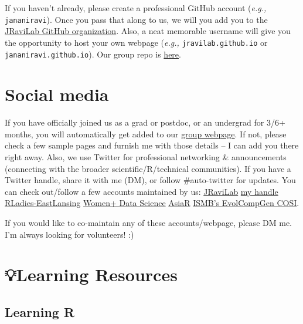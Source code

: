\documentclass[
  letterpaper,
  DIV=11,
  numbers=noendperiod]{scrreprt}
\begin{document}
If you haven't already, please create a professional GitHub account
(\emph{e.g.,} \texttt{jananiravi}). Once you pass that along to us, we
will you add you to the \href{https://github.com/jravilab}{JRaviLab
GitHub organization}. Also, a neat memorable username will give you the
opportunity to host your own webpage (\emph{e.g.,}
\texttt{jravilab.github.io} or \texttt{jananiravi.github.io}). Our group
repo is
\href{https://github.com/JRaviLab/group/tree/master/meetings}{here}.


\hypertarget{social-media}{%
\chapter{Social media}\label{social-media}}

If you have officially joined us as a grad or postdoc, or an undergrad
for 3/6+ months, you will automatically get added to our
\href{https://jravilab.github.io/\#people}{group webpage}. If not,
please check a few sample pages and furnish me with those details -- I
can add you there right away. Also, we use Twitter for professional
networking \& announcements (connecting with the broader
scientific/R/technical communities). If you have a Twitter handle, share
it with me (DM), or follow \#auto-twitter for updates. You can check
out/follow a few accounts maintained by us:
\href{https://twitter.com/jravilab}{JRaviLab} \textbar{}
\href{https://twitter.com/janani137}{my handle} \textbar{}
\href{https://twitter.com/rladies-eastlansing}{RLadies-EastLansing}
\textbar{} \href{https://twitter.com/womenplusdata}{Women+ Data Science}
\textbar{} \href{https://twitter.com/AsiaR-comm}{AsiaR} \textbar{}
\href{https://twitter.com/EvolComp}{ISMB's EvolCompGen COSI}.

If you would like to co-maintain any of these accounts/webpage, please
DM me. I'm always looking for volunteers! :)


\hypertarget{learning-resources}{%
\chapter{💡Learning Resources}\label{learning-resources}}

\hypertarget{learning-r}{%
\section{Learning R}\label{learning-r}}
\end{document}
